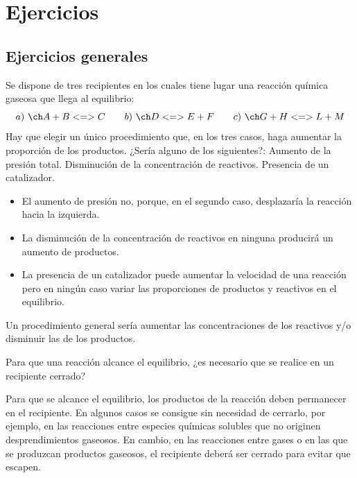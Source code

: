 

\section{Ejercicios}

\subsection{Ejercicios generales}

\begin{exercise}
    Se dispone de tres recipientes en los cuales tiene lugar una reacción química gaseosa que llega al equilibrio:
    \begin{equation*}
        a)\ \formula{A + B <=> C} \qquad b)\ \formula{D  <=> E + F} \qquad c)\ \formula{G + H <=> L + M}
    \end{equation*}
    Hay que elegir un único procedimiento que, en los tres casos, haga aumentar la proporción de los productos.
    ¿Sería alguno de los siguientes?: Aumento de la presión total.
    Disminución de la concentración de reactivos.
    Presencia de un catalizador.
    \begin{solu}
        \begin{itemize}
            \item El aumento de presión no, porque, en el segundo caso, desplazaría la reacción hacia la izquierda.
            \item La disminución de la concentración de reactivos en ninguna producirá un aumento de productos.
            \item La presencia de un catalizador puede aumentar la velocidad de una reacción pero en ningún caso variar las proporciones de productos y reactivos en el equilibrio.
        \end{itemize}
        Un procedimiento general sería aumentar las concentraciones de los reactivos y/o disminuir las de
        los productos.
    \end{solu}
\end{exercise}

\begin{exercise} %
    Para que una reacción alcance el equilibrio, ¿es necesario que se realice en un recipiente cerrado?
    \begin{solu}
        Para que se alcance el equilibrio, los productos de la reacción deben permanecer en el recipiente.
        En algunos casos se consigue sin necesidad de cerrarlo, por ejemplo, en las reacciones entre especies
        químicas solubles que no originen desprendimientos gaseosos. En cambio, en las reacciones
        entre gases o en las que se produzcan productos gaseosos, el recipiente deberá ser cerrado para
        evitar que escapen.
    \end{solu}
\end{exercise}

